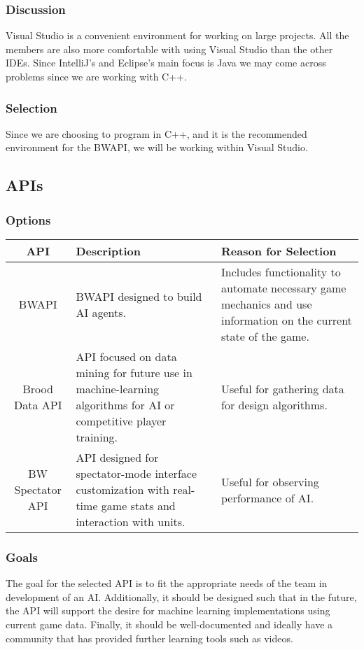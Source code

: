\documentclass[10pt,letterpaper,onecolumn,draftclsnofoot]{IEEEtran}
\begin{document}
\subsubsection{Discussion}
Visual Studio is a convenient environment for working on large projects. All the members are also more comfortable with using Visual Studio than the other IDEs. Since IntelliJ's and Eclipse's main focus is Java we may come across problems since we are working with C++.

\subsubsection{Selection}
Since we are choosing to program in C++, and it is the recommended environment for the BWAPI, we will be working within Visual Studio.

\subsection{APIs}
\subsubsection{Options}
\begin{center}
	\begin{tabular}{ ||C|L|L|| } 
		\hline
		API & Description & Reason for Selection \\
		\hline
		BWAPI & BWAPI designed to build AI agents. & Includes functionality to automate necessary game mechanics and use information on the current state of the game. \\ 
		\hline
		Brood Data API & API focused on data mining for future use in machine-learning algorithms for AI or competitive player training. & Useful for gathering data for design algorithms.\\ 
		\hline
		 BW Spectator API & API designed for spectator-mode interface customization with real-time game stats and interaction with units. & Useful for observing performance of AI. \\ 
		\hline
	\end{tabular}
\end{center}
\subsubsection{Goals}
	The goal for the selected API is to fit the appropriate needs of the team in development of an AI. Additionally, it should be designed such that in the future, the API will support the desire for machine learning implementations using current game data. Finally, it should be well-documented and ideally have a community that has provided further learning tools such as videos.
\end{document}
